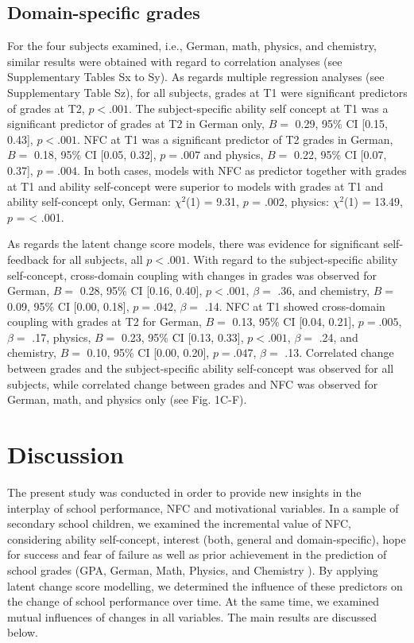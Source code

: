 \documentclass[
  man]{apa6}
\begin{document}
\hypertarget{domain-specific-grades}{%
\subsection{Domain-specific grades}\label{domain-specific-grades}}

For the four subjects examined, i.e., German, math, physics, and chemistry, similar results were obtained with regard to correlation analyses (see Supplementary Tables Sx to Sy). As regards multiple regression analyses (see Supplementary Table Sz), for all subjects, grades at T1 were significant predictors of grades at T2, \(p<.001\). The subject-specific ability self concept at T1 was a significant predictor of grades at T2 in German only, \(B=\) 0.29, 95\% CI {[}0.15, 0.43{]}, \(p< .001\). NFC at T1 was a significant predictor of T2 grades in German, \(B=\) 0.18, 95\% CI {[}0.05, 0.32{]}, \(p=.007\) and physics, \(B=\) 0.22, 95\% CI {[}0.07, 0.37{]}, \(p=.004\). In both cases, models with NFC as predictor together with grades at T1 and ability self-concept were superior to models with grades at T1 and ability self-concept only, German: \(\chi^2\)(1) = 9.31, \(p\) = .002, physics: \(\chi^2\)(1) = 13.49, \(p\) = \textless{} .001.

As regards the latent change score models, there was evidence for significant self-feedback for all subjects, all \(p<.001\). With regard to the subject-specific ability self-concept, cross-domain coupling with changes in grades was observed for German, \(B=\) 0.28, 95\% CI {[}0.16, 0.40{]}, \(p< .001\), \(\beta=\) .36, and chemistry, \(B=\) 0.09, 95\% CI {[}0.00, 0.18{]}, \(p=.042\), \(\beta=\) .14. NFC at T1 showed cross-domain coupling with grades at T2 for German, \(B=\) 0.13, 95\% CI {[}0.04, 0.21{]}, \(p=.005\), \(\beta=\) .17, physics, \(B=\) 0.23, 95\% CI {[}0.13, 0.33{]}, \(p< .001\), \(\beta=\) .24, and chemistry, \(B=\) 0.10, 95\% CI {[}0.00, 0.20{]}, \(p=.047\), \(\beta=\) .13. Correlated change between grades and the subject-specific ability self-concept was observed for all subjects, while correlated change between grades and NFC was observed for German, math, and physics only (see Fig. 1C-F).

\hypertarget{discussion}{%
\section{Discussion}\label{discussion}}

The present study was conducted in order to provide new insights in the interplay of school performance, NFC and motivational variables. In a sample of secondary school children, we examined the incremental value of NFC, considering ability self-concept, interest (both, general and domain-specific), hope for success and fear of failure as well as prior achievement in the prediction of school grades (GPA, German, Math, Physics, and Chemistry ). By applying latent change score modelling, we determined the influence of these predictors on the change of school performance over time. At the same time, we examined mutual influences of changes in all variables. The main results are discussed below.
\end{document}
